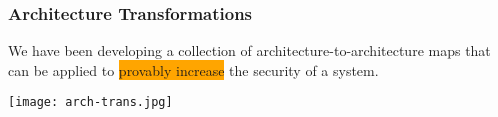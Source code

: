 \documentclass{beamer}
\newcommand{\kemph}[1]{\colorbox{orange}{#1}}
\begin{document}









\begin{frame}\frametitle{Architecture Transformations}

We have been developing a collection of architecture-to-architecture maps that can be applied to
\kemph{provably increase} the security of a system.

\vspace*{4mm}

\texttt{[image: arch-trans.jpg]}
\end{frame}
\end{document}
